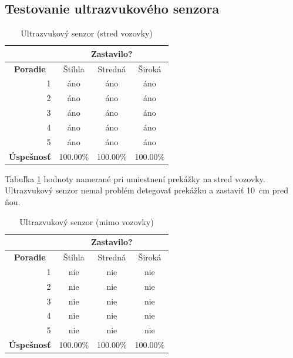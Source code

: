 \subsection{Testovanie ultrazvukového senzora}
\begin{table}[!ht]
\caption{Ultrazvukový senzor (stred vozovky)}
\label{tab:ultrazvuk1}
\centering
\begin{tabular}{|l r|c|c|c|}
        \hline
        \multicolumn{2}{|c|}{} & \multicolumn{3}{c|}{\textbf{Zastavilo?}} \\ \hline
        \multicolumn{2}{|c|}{\textbf{Poradie}} & Štíhla & Stredná & Široká \\ \hline
        & 1 & áno & áno & áno \\ \hline
        & 2 & áno & áno & áno \\ \hline
        & 3 & áno & áno & áno \\ \hline
        & 4 & áno & áno & áno \\ \hline
        & 5 & áno & áno & áno \\ \hline
        \multicolumn{2}{|l|}{\textbf{Úspešnosť}} & 100.00\% & 100.00\% & 100.00\% \\ \hline
\end{tabular}
\end{table}
Tabuľka \ref{tab:ultrazvuk1} hodnoty namerané pri umiestnení prekážky na stred vozovky. Ultrazvukový senzor nemal problém detegovať prekážku a zastaviť 10~cm pred ňou.\par
\begin{table}[!ht]
\caption{Ultrazvukový senzor (mimo vozovky)}
\label{tab:ultrazvuk2}
\centering
\begin{tabular}{|l r|c|c|c|}
        \hline
        \multicolumn{2}{|c|}{} & \multicolumn{3}{c|}{\textbf{Zastavilo?}} \\ \hline
        \multicolumn{2}{|c|}{\textbf{Poradie}} & Štíhla & Stredná & Široká \\ \hline
        & 1 & nie & nie & nie \\ \hline
        & 2 & nie & nie & nie \\ \hline
        & 3 & nie & nie & nie \\ \hline
        & 4 & nie & nie & nie \\ \hline
        & 5 & nie & nie & nie \\ \hline
        \multicolumn{2}{|l|}{\textbf{Úspešnosť}} & 100.00\% & 100.00\% & 100.00\% \\ \hline
\end{tabular}
\end{table}
